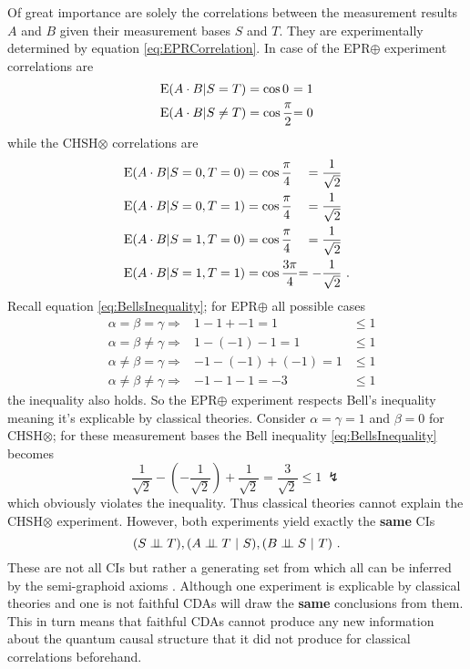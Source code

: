 Of great importance are solely the correlations between the measurement results $A$ and $B$ given their measurement bases $S$ and $T$.
They are experimentally determined by equation \eqref{eq:EPRCorrelation}.
In case of  the \ac{EPR}$\oplus$ experiment correlations are
\begin{equation}
\begin{alignedat}{4}
\mathrm{E}(A\cdot B|S=T)&=\cos0&=1&
\\
\mathrm{E}(A\cdot B|S\neq T)&=\cos\frac{\pi}{2}&=0&
\end{alignedat}
\end{equation}
while the \ac{CHSH}$\otimes$ correlations are 
\begin{equation}
\begin{alignedat}{3}
\mathrm{E}(A\cdot B|S=0,T=0)&=\cos\frac{\pi}{4}&=\frac{1}{\sqrt2}&
\\
\mathrm{E}(A\cdot B|S=0,T=1)&=\cos\frac{\pi}{4}&=\frac{1}{\sqrt2}&
\\
\mathrm{E}(A\cdot B|S=1,T=0)&=\cos\frac{\pi}{4}&=\frac{1}{\sqrt2}&
\\
\mathrm{E}(A\cdot B|S=1,T=1)&=\cos\frac{3\pi}{4}&=-\frac{1}{\sqrt2}&
\  .
\end{alignedat}
\end{equation}
Recall equation \eqref{eq:BellsInequality}; for \ac{EPR}$\oplus$ all possible cases
\begin{equation}
\begin{alignedat}{4}
&\alpha=\beta=\gamma
\Rightarrow&
1-1+-1=1&\leq1
\\
&\alpha=\beta\neq\gamma
\Rightarrow&
1-(-1)-1=1&\leq1
\\
&\alpha\neq\beta=\gamma
\Rightarrow&
-1-(-1)+(-1)=1&\leq1
\\
&\alpha\neq\beta\neq\gamma
\Rightarrow&
-1-1-1=-3&\leq1
\end{alignedat}
\end{equation}
the inequality also holds. So the \ac{EPR}$\oplus$ experiment respects Bell's inequality meaning it's explicable by classical theories.
Consider $\alpha=\gamma=1$ and $\beta=0$ for \ac{CHSH}$\otimes$; for these measurement bases the Bell inequality \eqref{eq:BellsInequality} becomes
\begin{equation}
\frac{1}{\sqrt2}-\left(-\frac{1}{\sqrt2}\right)+\frac{1}{\sqrt2}
=\frac{3}{\sqrt2}
\leq1
\ \lightning
\end{equation}
which obviously violates the inequality. Thus classical theories cannot explain the \ac{CHSH}$\otimes$ experiment.
However, both experiments yield exactly the \textbf{same} \acp{CI}
\begin{equation}
\label{eq:CIs}
(S\independent T),
(A\independent T\ |\ S),
(B\independent S\ |\ T)
\ .
\end{equation}
These are not all \acp{CI} but rather a generating set from which all can be inferred by the semi-graphoid axioms \cite{Wood.2015}.
Although one experiment is explicable by classical theories and one is not faithful \aclp{CDA} will draw the \textbf{same} conclusions from them.
This in turn means that faithful \aclp{CDA} cannot produce any new information about the quantum causal structure that it did not produce for classical correlations beforehand.

